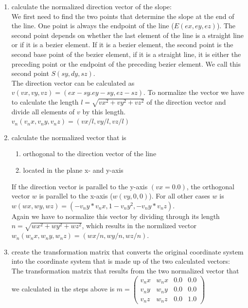 \begin{enumerate}
\item{calculate the normalized direction vector of the slope:\\
We first need to find the two points that determine the slope at the end of the line. One point is always the endpoint of 
the line ($E(ex,ey,ez)$). The second point depends on whether the last element of the line is a straight line or if it is
a bezier element. If it is a bezier element, the second point is the second base point of the bezier element, if it is a 
straight line, it is either the preceding point or the endpoint of the preceding bezier element. We call this second
point $S(sy,dy,sz)$.\\ The direction vector can be calculated as $v(vx,vy,vz)=(ex-sy.ey-sy,ez-sz)$. To normalize the vector
we have to calculate the length $l=\sqrt{vx^2+vy^2+vz^2}$ of the direction vector and divide all elements of $v$ by this
length. $v_n(v_{n}x,v_{n}y,v_{n}z)=(vx/l,vy/l,vz/l)$}

\item{calculate the normalized vector that is
\begin{enumerate}
\item{orthogonal to the direction vector of the line}
\item{located in the plane x- and y-axis}
\end{enumerate}
If the direction vector is parallel to the y-axis $(vx=0.0)$, the orthogonal vector $w$ is parallel to the x-axis ($w(vy,0,0)$).
For all other cases $w$ is $w(wx,wy,wz)=(-v_{n}y*v_{n}x,1-v_{n}y^2,-v_{n}y*v_{n}z)$.\\ Again we have to normalize this
vector by dividing through its length $n=\sqrt{wx^2+wy^2+wz^2}$, which results in the normlized vector\\
$w_n(w_{n}x,w_{n}y,w_{n}z)=(wx/n,wy/n,wz/n)$.
}
\item{create the transformation matrix that converts the original coordinate system into the coordinate system
that is made up of the two calculated vectors:\\
\vspace*{0.3cm}
The transformation matrix that results from the two normalized vector that we calculated in the steps above
is $m=\left(\begin{array}{cccc} v_{n}x & w_{n}x & 0.0 & 0.0\\ v_{n}y & w_{n}y & 0.0 & 0.0\\ v_{n}z & w_{n}z & 0.0 & 1.0 \end{array}\right)$}
\end{enumerate}


